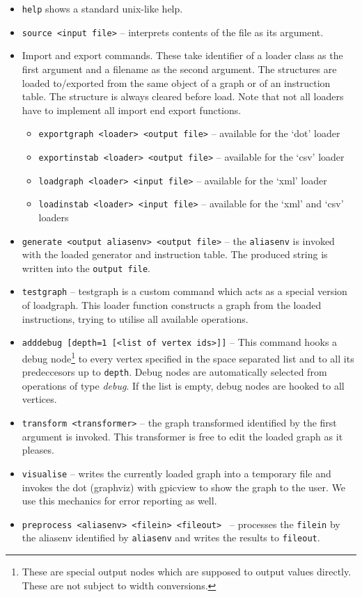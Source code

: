 \begin{itemize}
  \item \texttt{help} shows a standard unix-like help.
  \item \texttt{source <input file>} -- interprets contents of the file as its argument.
  \item Import and export commands. These take identifier of a loader class as the first argument and a filename as the second argument. The structures are loaded to/exported from the same object of a graph or of an instruction table. The structure is always cleared before load. Note that not all loaders have to implement all import end export functions. 
  \begin{itemize}
    \item \texttt{exportgraph  <loader> <output file>} -- available for the `dot' loader
    \item \texttt{exportinstab <loader> <output file>} -- available for the `csv' loader
    \item \texttt{loadgraph    <loader> <input file>} -- available for the `xml' loader
    \item \texttt{loadinstab   <loader> <input file>} -- available for the `xml' and `csv' loaders
  \end{itemize}
  \item \texttt{generate <output aliasenv> <output file>} -- the \texttt{aliasenv} is invoked with the loaded generator and instruction table. The produced string is written into the \texttt{output file}.
  \item \texttt{testgraph} -- testgraph is a custom command which acts as a special version of loadgraph. This loader function constructs a graph from the loaded instructions, trying to utilise all available operations. 
  \item \texttt{adddebug  [depth=1 [<list of vertex ids>]]} -- This command hooks a debug node\footnote{These are special output nodes which are supposed to output values directly. These are not subject to width conversions.} to every vertex specified in the space separated list and to all its predeccesors up to \texttt{depth}. Debug nodes are automatically selected from operations of type \emph{debug}. If the list is empty, debug nodes are hooked to all vertices.
  \item \texttt{transform  <transformer>} -- the graph transformed identified by the first argument is invoked. This transformer is free to edit the loaded graph as it pleases.
  \item \texttt{visualise} -- writes the currently loaded graph into a temporary file and invokes the dot (graphviz) with gpicview to show the graph to the user. We use this mechanics for error reporting as well.
  \item \texttt{preprocess <aliasenv> <filein> <fileout> } -- processes the \texttt{filein} by the aliasenv identified by \texttt{aliasenv} and writes the results to \texttt{fileout}.
\end{itemize}
